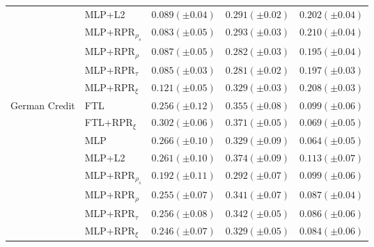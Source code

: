 \begin{tabular}{lllll}
 & MLP+L2 & $0.089 (\pm0.04)$ & $0.291 (\pm0.02)$ & $0.202 (\pm0.04)$ \\
 & MLP+RPR$_{\rho_s}$ & $0.083 (\pm0.05)$ & $0.293 (\pm0.03)$ & $0.210 (\pm0.04)$ \\
 & MLP+RPR$_{\rho}$ & $0.087 (\pm0.05)$ & $0.282 (\pm0.03)$ & $0.195 (\pm0.04)$ \\
 & MLP+RPR$_{\tau}$ & $0.085 (\pm0.03)$ & $0.281 (\pm0.02)$ & $0.197 (\pm0.03)$ \\
 & MLP+RPR$_{\xi}$ & $0.121 (\pm0.05)$ & $0.329 (\pm0.03)$ & $0.208 (\pm0.03)$ \\
\cline{1-5}
\multirow[t]{8}{*}{German Credit} & FTL & $0.256 (\pm0.12)$ & $0.355 (\pm0.08)$ & $0.099 (\pm0.06)$ \\
 & FTL+RPR$_{\xi}$ & $0.302 (\pm0.06)$ & $0.371 (\pm0.05)$ & $0.069 (\pm0.05)$ \\
 & MLP & $0.266 (\pm0.10)$ & $0.329 (\pm0.09)$ & $0.064 (\pm0.05)$ \\
 & MLP+L2 & $0.261 (\pm0.10)$ & $0.374 (\pm0.09)$ & $0.113 (\pm0.07)$ \\
 & MLP+RPR$_{\rho_s}$ & $0.192 (\pm0.11)$ & $0.292 (\pm0.07)$ & $0.099 (\pm0.06)$ \\
 & MLP+RPR$_{\rho}$ & $0.255 (\pm0.07)$ & $0.341 (\pm0.07)$ & $0.087 (\pm0.04)$ \\
 & MLP+RPR$_{\tau}$ & $0.256 (\pm0.08)$ & $0.342 (\pm0.05)$ & $0.086 (\pm0.06)$ \\
 & MLP+RPR$_{\xi}$ & $0.246 (\pm0.07)$ & $0.329 (\pm0.05)$ & $0.084 (\pm0.06)$ \\
\cline{1-5}
\bottomrule
\end{tabular}
